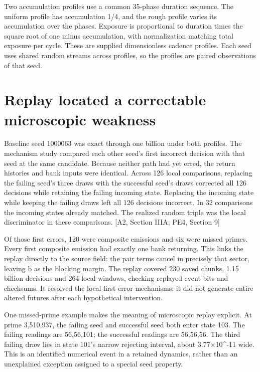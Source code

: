 Two accumulation profiles use a common 35-phase duration sequence. The uniform profile has accumulation 1/4, and the rough profile varies its accumulation over the phases. Exposure is proportional to duration times the square root of one minus accumulation, with normalization matching total exposure per cycle. These are supplied dimensionless cadence profiles. Each seed uses shared random streams across profiles, so the profiles are paired observations of that seed.

\section{Replay located a correctable microscopic weakness}\label{replay-located-a-correctable-microscopic-weakness}

Baseline seed 1000063 was exact through one billion under both profiles. The mechanism study compared each other seed's first incorrect decision with that seed at the same candidate. Because neither path had yet erred, the return histories and bank inputs were identical. Across 126 local comparisons, replacing the failing seed's three draws with the successful seed's draws corrected all 126 decisions while retaining the failing incoming state. Replacing the incoming state while keeping the failing draws left all 126 decisions incorrect. In 32 comparisons the incoming states already matched. The realized random triple was the local discriminator in these comparisons. {[}A2, Section IIIA; PE4, Section 9{]}

Of those first errors, 120 were composite emissions and six were missed primes. Every first composite emission had exactly one bank returning. This links the replay directly to the source field: the pair terms cancel in precisely that sector, leaving b as the blocking margin. The replay covered 230 saved chunks, 1.15 billion decisions and 264 local windows, checking replayed event bits and checksums. It resolved the local first-error mechanisms; it did not generate entire altered futures after each hypothetical intervention.

One missed-prime example makes the meaning of microscopic replay explicit. At prime 3,510,937, the failing seed and successful seed both enter state 103. The failing readings are 56,56,101; the successful readings are 56,56,56. The third failing draw lies in state 101's narrow rejecting interval, about 3.77×10\^{}-11 wide. This is an identified numerical event in a retained dynamics, rather than an unexplained exception assigned to a special seed property.

